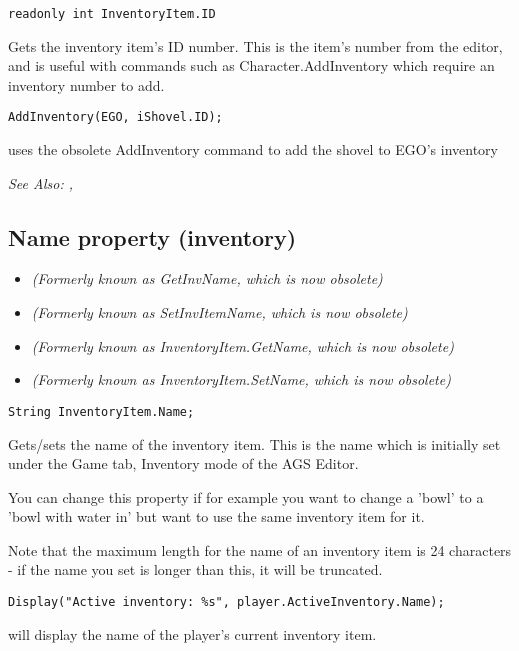 \begin{verbatim}
readonly int InventoryItem.ID
\end{verbatim}
Gets the inventory item's ID number. This is the item's number from the editor, and is
useful with commands such as Character.AddInventory which require an inventory number
to add.

\begin{verbatim}
AddInventory(EGO, iShovel.ID);
\end{verbatim}
uses the obsolete AddInventory command to add the shovel to EGO's inventory

\it{See Also:} ,


\subsection{Name property (inventory)}\label{InventoryItem.Name}%

\begin{itemize}
\item \it{(Formerly known as GetInvName, which is now obsolete)}
\item \it{(Formerly known as SetInvItemName, which is now obsolete)}
\item \it{(Formerly known as InventoryItem.GetName, which is now obsolete)}
\item \it{(Formerly known as InventoryItem.SetName, which is now obsolete)}
\end{itemize}

\begin{verbatim}
String InventoryItem.Name;
\end{verbatim}
Gets/sets the name of the inventory item. This is the name which is
initially set under the Game tab, Inventory mode of the AGS Editor.

You can change this property if for example you want to change a 'bowl'
to a 'bowl with water in' but want to use the same inventory item for it.

Note that the maximum length for the name of an inventory item is 24 characters - if the
name you set is longer than this, it will be truncated.

\begin{verbatim}
Display("Active inventory: %s", player.ActiveInventory.Name);
\end{verbatim}
will display the name of the player's current inventory item.

